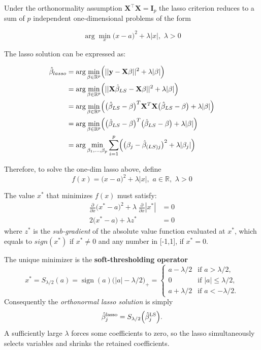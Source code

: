 \documentclass[
]{book}
\begin{document}
Under the orthonormality assumption \(\mathbf{X}^\top\mathbf{X}=\mathbf{I}_p\) the lasso criterion reduces to a sum of \(p\) independent one-dimensional problems of the form

\[\arg \min_{x} \bigl( x-a \bigr )^2 + \lambda |x|,\,\, \lambda >0\]

The lasso solution can be expressed as:

\begin{align*}
\hat{\beta}_{lasso} &= \arg \min_{\beta\in \mathbb{R}^{p}} \Bigl( ||\mathbf{y}-\mathbf{X} \beta||^2 + \lambda |\beta| \Bigr)\\
&= \arg \min_{\beta\in \mathbb{R}^{p}} \Bigl( ||\mathbf{X} \hat{\beta}_{LS} -\mathbf{X} \beta||^2 + \lambda |\beta| \Bigr)\\
&= \arg \min_{\beta\in \mathbb{R}^{p}} \Bigl( \bigl(  \hat{\beta}_{LS} - \beta \bigr)^T \mathbf{X}^T \mathbf{X}  \bigl(  \hat{\beta}_{LS} - \beta \bigr) + \lambda |\beta| \Bigr)\\
&= \arg \min_{\beta\in \mathbb{R}^{p}} \Bigl( \bigl(  \hat{\beta}_{LS} - \beta \bigr)^T  \bigl(  \hat{\beta}_{LS} - \beta \bigr) + \lambda |\beta| \Bigr)\\
&= \arg \min_{\beta_1, \ldots, \beta_p} \sum_{i=1}^{p}  \Bigl( \bigl(  \beta_{j} - \hat{\beta}_{(LS)j} \bigr)^2  + \lambda |\beta_j| \Bigr)\\
\end{align*}

Therefore, to solve the one-dim lasso above, define
\[f(x)  = \bigl( x-a \bigr )^2 + \lambda |x|,\,\, a\in\mathbb{R},\,\,\lambda >0\]

The value \(x^*\) that minimizes \(f(x)\) must satisfy:
\begin{align*}
\frac{\partial}{\partial x} \bigl(x^* - a \bigr)^2 + \lambda \;\frac{\partial}{\partial x} |x^*| & = 0\\
2\bigl(x^* - a \bigr) +\lambda z^* &= 0
\end{align*}
where \(z^*\) is the \emph{sub-gradient} of the absolute value function evaluated at \(x^*\), which equals to \(sign(x^*)\) if \(x^*\neq 0\) and any number in {[}-1,1{]}, if \(x^*=0\).

The unique minimizer is the \textbf{soft-thresholding operator}
\[
x^*=S_{\lambda/2}(a)
= \operatorname{sign}(a)\bigl(|a|-\lambda/2\bigr)_+
=
\begin{cases}
a-\lambda/2 & \text{if }a>\lambda/2,\\
0 & \text{if }|a|\le\lambda/2,\\
a+\lambda/2 & \text{if }a<-\lambda/2.
\end{cases}
\]
Consequently the \emph{orthonormal lasso solution} is simply
\[
\hat{\beta}_j^{\text{lasso}}
= S_{\lambda/2} \Bigl(\hat{\beta}_j^{\text{LS}}\Bigr).
\]
A sufficiently large \(\lambda\) forces some coefficients to zero, so the lasso simultaneously selects variables and shrinks the retained coefficients.
\end{document}
